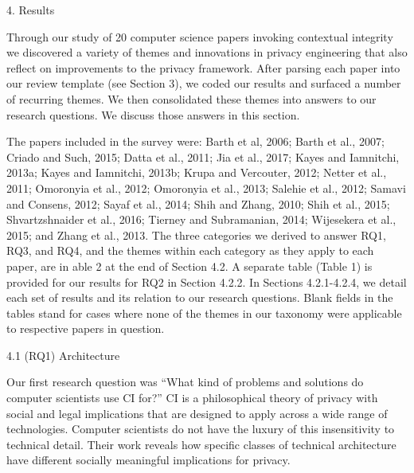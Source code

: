 \documentclass[../thesis.tex]{subfiles}
\begin{document}
4. Results

Through our study of 20 computer science papers invoking contextual
integrity we discovered a variety of themes and innovations in privacy
engineering that also reflect on improvements to the privacy framework.
After parsing each paper into our review template (see Section 3), we
coded our results and surfaced a number of recurring themes. We then
consolidated these themes into answers to our research questions. We
discuss those answers in this section.


\bigskip

The papers included in the survey were:
\textcolor[rgb]{0.2,0.2,0.2}{Barth et al, 2006; Barth et al., 2007;
Criado and Such, 2015; Datta et al., 2011; Jia et al., 2017; Kayes and}
Iamnitchi, 20\textcolor[rgb]{0.2,0.2,0.2}{13a; Kayes and} Iamnitchi,
20\textcolor[rgb]{0.2,0.2,0.2}{13b; K}rupa and Vercouter,
20\textcolor[rgb]{0.2,0.2,0.2}{12; N}etter et al.,
20\textcolor[rgb]{0.2,0.2,0.2}{11; O}moronyia et al.,
20\textcolor[rgb]{0.2,0.2,0.2}{12; O}moronyia et al.,
20\textcolor[rgb]{0.2,0.2,0.2}{13; }Salehie et al.,
20\textcolor[rgb]{0.2,0.2,0.2}{12; S}amavi and Consens,
20\textcolor[rgb]{0.2,0.2,0.2}{12; S}ayaf et al.,
20\textcolor[rgb]{0.2,0.2,0.2}{14; Shih and }Zhang,
20\textcolor[rgb]{0.2,0.2,0.2}{10; Shih et al., 2015; }Shvartzshnaider
et al., 20\textcolor[rgb]{0.2,0.2,0.2}{16; T}ierney and Subramanian,
20\textcolor[rgb]{0.2,0.2,0.2}{14; W}ijesekera et al.,
20\textcolor[rgb]{0.2,0.2,0.2}{15; and Z}hang et al.,
20\textcolor[rgb]{0.2,0.2,0.2}{13}. The three categories we derived to
answer RQ1, RQ3, and RQ4, and the themes within each category as they
apply to each paper, are in able 2 at the end of Section 4.2. A
separate table (Table 1) is provided for our results for RQ2 in Section
4.2.2. In Sections 4.2.1-4.2.4, we detail each set of results and its
relation to our research questions. Blank fields in the tables stand
for cases where none of the themes in our taxonomy were applicable to
respective papers in question.

{\color[rgb]{0.2627451,0.2627451,0.2627451}
4.1 (RQ1) Architecture}

\textcolor[rgb]{0.2,0.2,0.2}{Our first research question wa}s
``What kind of problems and solutions do computer
scientists use CI for?'' CI is a philosophical theory
of privacy with social and legal implications that are designed to
apply across a wide range of technologies. Computer scientists do not
have the luxury of this insensitivity to technical detail. Their work
reveals how specific classes of technical architecture have different
socially meaningful implications for privacy.
\end{document}
